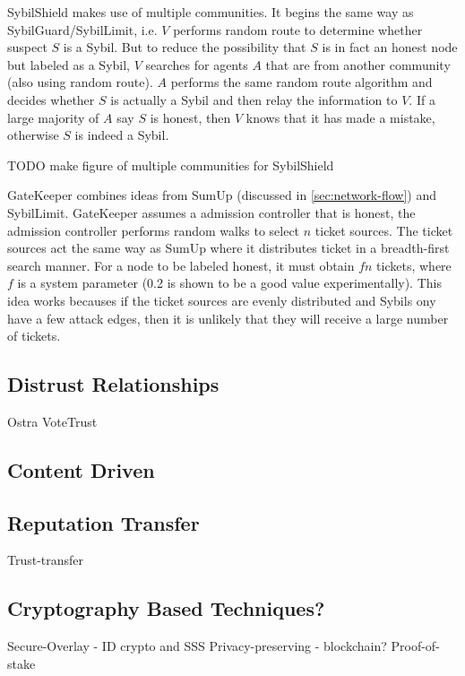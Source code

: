 SybilShield\cite{shi2013sybilshield} makes use of multiple communities. It
begins the same way as SybilGuard/SybilLimit, i.e. $V$ performs random route to
determine whether suspect $S$ is a Sybil. But to reduce the possibility that $S$
is in fact an honest node but labeled as a Sybil, $V$ searches for agents $A$
that are from another community (also using random route). $A$ performs the same
random route algorithm and decides whether $S$ is actually a Sybil and then
relay the information to $V$. If a large majority of $A$ say $S$ is honest, then
$V$ knows that it has made a mistake, otherwise $S$ is indeed a Sybil.

TODO make figure of multiple communities for SybilShield

GateKeeper\cite{tran2011optimal} combines ideas from SumUp (discussed in
\autoref{sec:network-flow}) and SybilLimit. GateKeeper assumes a admission
controller that is honest, the admission controller performs random walks to
select $n$ ticket sources. The ticket sources act the same way as SumUp where it
distributes ticket in a breadth-first search manner. For a node to be labeled
honest, it must obtain $fn$ tickets, where $f$ is a system parameter (0.2 is
shown to be a good value experimentally). This idea works becauses if the ticket
sources are evenly distributed and Sybils ony have a few attack edges, then it
is unlikely that they will receive a large number of tickets.


\subsection{Distrust Relationships}
Ostra\cite{mislove2008ostra}
VoteTrust\cite{xue2013votetrust}

\subsection{Content Driven}
\cite{chatterjee2008robust}

\subsection{Reputation Transfer}
Trust-transfer\cite{seigneur2005trust}

\subsection{Cryptography Based Techniques?}
Secure-Overlay\cite{lua2007securing} - ID crypto and SSS
Privacy-preserving\cite{schaub2016trustless} - blockchain?
Proof-of-stake\cite{dennis2016rep}

